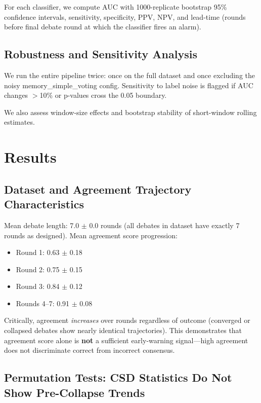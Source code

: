 \documentclass[11pt,letterpaper]{article}
\begin{document}
For each classifier, we compute AUC with 1000-replicate bootstrap 95\% confidence intervals, sensitivity, specificity, PPV, NPV, and lead-time (rounds before final debate round at which the classifier fires an alarm).

\subsection{Robustness and Sensitivity Analysis}

We run the entire pipeline twice: once on the full dataset and once excluding the noisy memory\_simple\_voting config. Sensitivity to label noise is flagged if AUC changes $>$10\% or p-values cross the 0.05 boundary.

We also assess window-size effects and bootstrap stability of short-window rolling estimates.

\section{Results}

\subsection{Dataset and Agreement Trajectory Characteristics}

Mean debate length: 7.0 $\pm$ 0.0 rounds (all debates in dataset have exactly 7 rounds as designed). Mean agreement score progression:
\begin{itemize}
\item Round 1: 0.63 $\pm$ 0.18
\item Round 2: 0.75 $\pm$ 0.15
\item Round 3: 0.84 $\pm$ 0.12
\item Rounds 4--7: 0.91 $\pm$ 0.08
\end{itemize}

Critically, agreement \emph{increases} over rounds regardless of outcome (converged or collapsed debates show nearly identical trajectories). This demonstrates that agreement score alone is \textbf{not} a sufficient early-warning signal---high agreement does not discriminate correct from incorrect consensus.

\subsection{Permutation Tests: CSD Statistics Do Not Show Pre-Collapse Trends}
\end{document}
